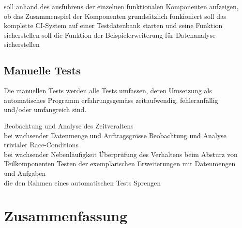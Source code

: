 \begin{description}
  \dhitem[Komponentendurchlauf]
    soll anhand des ausf\"uhrens der einzelnen funktionalen Komponenten
    aufzeigen, ob das Zusammenspiel der Komponenten
    grunds\"atzlich funkioniert
  \dhitem[Komplettstystem]
    soll das komplette CI-System auf einer Testdatenbank starten
    und seine Funktion sicherstellen
    soll die Funktion der Beispielerweiterung f\"ur Datenanalyse sicherstellen
\end{description}

\subsection{Manuelle Tests}

Die manuellen Tests werden alle Tests umfassen,
deren Umsetzung als automatisches Programm erfahrungsgem\"ass zeitaufwendig,
fehleranf\"allig und/oder umfangreich sind.


\begin{description}
    Beobachtung und Analyse des Zeitveraltens \\
    bei wachsender Datenmenge und Auftragsgr\"osse
    Beobachtung und Analyse trivialer Race-Conditions \\
    bei wachsender Nebenl\"aufigkeit
    \"Uberpr\"ufung des Verhaltens beim Absturz von Teilkomponenten
    Testen der exemplarischen Erweiterungen mit Datenmengen und Aufgaben \\
    die den Rahmen eines automatischen Tests Sprengen
\end{description}

\section{Zusammenfassung}

